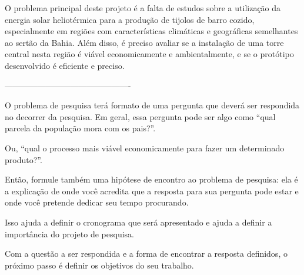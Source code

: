 O problema principal deste projeto é a falta de estudos sobre a utilização da energia solar heliotérmica para a produção de tijolos de barro cozido, especialmente em regiões com características climáticas e geográficas semelhantes ao sertão da Bahia. Além disso, é preciso avaliar se a instalação de uma torre central nesta região é viável economicamente e ambientalmente, e se o protótipo desenvolvido é eficiente e preciso.


----------------------------------------------


O problema de pesquisa terá formato de uma pergunta que deverá ser respondida no decorrer da pesquisa. Em geral, essa pergunta pode ser algo como “qual parcela da população mora com os pais?”.

Ou, “qual o processo mais viável economicamente para fazer um determinado produto?”.

Então, formule também uma hipótese de encontro ao problema de pesquisa: ela é a explicação de onde você acredita que a resposta para sua pergunta pode estar e onde você pretende dedicar seu tempo procurando.

Isso ajuda a definir o cronograma que será apresentado e ajuda a definir a importância do projeto de pesquisa.

Com a questão a ser respondida e a forma de encontrar a resposta definidos, o próximo passo é definir os objetivos do seu trabalho.
